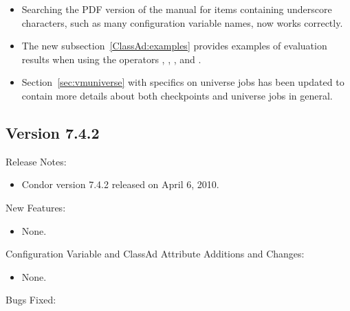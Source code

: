 \begin{itemize}

\item Searching the PDF version of the manual for items containing 
underscore characters, such as many configuration variable names,
now works correctly.

\item The new subsection~\ref{ClassAd:examples} provides examples of
evaluation results when using the operators \Expr{==}, ,
\Expr{!=}, and \Expr{=!=}.

\item Section~\ref{sec:vmuniverse} with specifics on 
universe jobs has been updated to contain more details about
both checkpoints and  universe jobs in general.

\end{itemize}


\subsection*{\label{sec:New-7-4-2}Version 7.4.2}

\noindent Release Notes:

\begin{itemize}

\item Condor version 7.4.2 released on April 6, 2010.

\end{itemize}


\noindent New Features:

\begin{itemize}

\item None.

\end{itemize}

\noindent Configuration Variable and ClassAd Attribute Additions and Changes:

\begin{itemize}

\item None.

\end{itemize}

\noindent Bugs Fixed:

